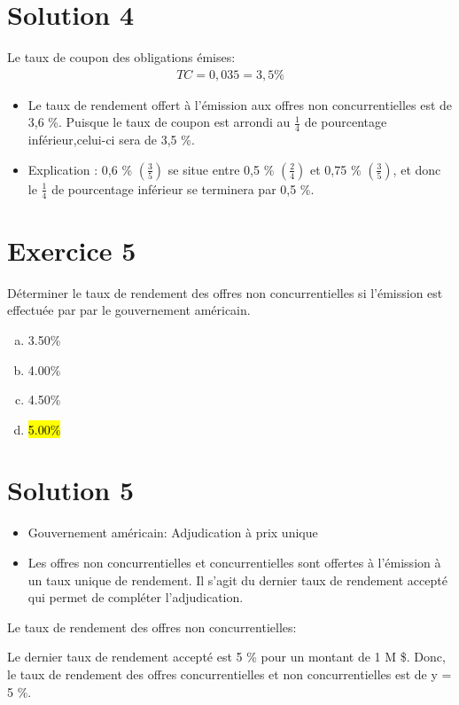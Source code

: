 \documentclass[10pt,a4paper]{article}
\begin{document}
\section*{Solution 4}
Le taux de coupon des obligations émises:
\begin{align*}
TC  = 0,035 = 3,5 \%
\end{align*}
\begin{itemize}
\item Le taux de rendement offert à l'émission aux offres non concurrentielles est de 3,6 \%. Puisque le taux de coupon est arrondi au $\frac{1}{4}$ de pourcentage inférieur,celui-ci sera de 3,5 \%.
\item Explication : 0,6 \% $(\frac{3}{5})$ se situe entre 0,5 \% $(\frac{2}{4})$ et 0,75 \% $(\frac{3}{5})$,  et donc le $\frac{1}{4}$ de pourcentage inférieur se terminera par 0,5 \%. 
\end{itemize}

\newpage

\section*{Exercice 5}
Déterminer le taux de rendement des offres non concurrentielles si l'émission est effectuée par par le gouvernement américain.

\begin{enumerate}[a)]
\item 3.50\%
\item 4.00\%
\item 4.50\%
\item \hl{5.00\%}
\end{enumerate}

\section*{Solution 5}
\begin{itemize}
\item Gouvernement américain: Adjudication à prix unique
\item Les offres non concurrentielles et concurrentielles sont offertes à l'émission à un taux unique de rendement. Il s'agit du dernier taux de rendement accepté qui permet de compléter l'adjudication.
\end{itemize}
Le taux de rendement des offres non concurrentielles:

\vspace{0.5cm}

Le dernier taux de rendement accepté est 5 \% pour un montant de 1 M \$.  Donc, le taux de rendement des offres concurrentielles et non concurrentielles est de y = 5 \%. 
\end{document}
